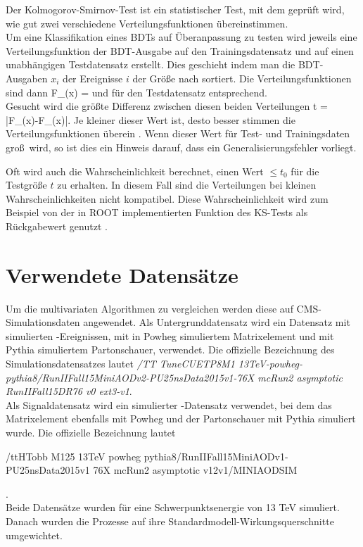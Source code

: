 Der Kolmogorov-Smirnov-Test ist ein statistischer Test, mit dem gepr\"uft wird, wie gut zwei verschiedene Verteilungsfunktionen \"ubereinstimmen.\\
Um eine Klassifikation eines BDTs auf \"Uberanpassung zu testen wird jeweils eine Verteilungsfunktion der BDT-Ausgabe auf den Trainingsdatensatz und auf einen unabh\"angigen Testdatensatz erstellt. Dies geschieht indem man die BDT-Ausgaben $x_i$ der Ereignisse $i$ der Gr\"o\ss e nach sortiert. Die Verteilungsfunktionen sind dann
\beq
F_{}(x) = 
\label{eq:CDF_train}
\eeq
und f\"ur den Testdatensatz entsprechend.\\
Gesucht wird die gr\"o\ss te Differenz zwischen diesen beiden Verteilungen
\beq
t = \cdot\max\left|F_{}(x)-F_{}(x)\right|.
\label{eq:KSTest}
\eeq
Je kleiner dieser Wert ist, desto besser stimmen die Verteilungsfunktionen \"uberein \cite{Blobel}. Wenn dieser Wert f\"ur Test- und Trainingsdaten gro\ss~wird, so ist dies ein Hinweis darauf, dass ein Generalisierungsfehler vorliegt.

Oft wird auch die Wahrscheinlichkeit berechnet, einen Wert $\leq t_0$ f\"ur die Testgr\"o\ss e $t$ zu erhalten. In diesem Fall sind die Verteilungen bei kleinen Wahrscheinlichkeiten nicht kompatibel. Diese Wahrscheinlichkeit wird zum Beispiel von der in ROOT implementierten Funktion des KS-Tests als R\"uckgabewert genutzt \cite{ROOT:TH1F}.

\section{Verwendete Datens\"atze}
\label{ch:Vergleich:sec:Daten}

Um die multivariaten Algorithmen zu vergleichen werden diese auf CMS-Simulationsdaten angewendet. Als Untergrunddatensatz wird ein Datensatz mit simulierten \ttb-Ereignissen, mit in Powheg \cite{Frixione:2007vw} simuliertem Matrixelement und mit Pythia \cite{Sjostrand2015159} simuliertem Partonschauer, verwendet. Die offizielle Bezeichnung des Simulationsdatensatzes lautet {\it/TT TuneCUETP8M1 13TeV-powheg-pythia8/RunIIFall15MiniAODv2-PU25nsData2015v1-76X mcRun2 asymptotic RunIIFall15DR76 v0 ext3-v1}.\\
Als Signaldatensatz wird ein simulierter \ttH-Datensatz verwendet, bei dem das Matrixelement ebenfalls mit Powheg und der Partonschauer mit Pythia simuliert wurde. Die offizielle Bezeichnung lautet \begin{it}/ttHTobb M125 13TeV powheg pythia8/RunIIFall15MiniAODv1-PU25nsData2015v1 76X mcRun2 asymptotic v12v1/MINIAODSIM\end{it}.\\
Beide Datens\"atze wurden f\"ur eine Schwerpunktsenergie von \num{13} \si{\tera\electronvolt} simuliert. Danach wurden die Prozesse auf ihre Standardmodell-Wirkungsquerschnitte umgewichtet.

